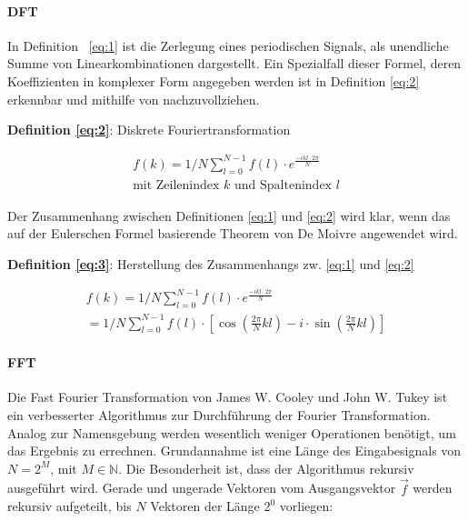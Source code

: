 \paragraph{DFT}
In Definition ~\eqref{eq:1} ist die Zerlegung eines periodischen Signals, als unendliche Summe von Linearkombinationen dargestellt. Ein Spezialfall dieser Formel, deren Koeffizienten in komplexer Form angegeben werden ist in Definition \eqref{eq:2} erkennbar und mithilfe von \cite{arenz_fourier} nachzuvollziehen.

\begin{flushleft}
	\textbf{Definition \eqref{eq:2}}: Diskrete Fouriertransformation
\end{flushleft}
\vspace{\baselineskip}
\begin{equation}
	\begin{gathered}
		f(k) = 1/N \sum_{l=0}^{N-1}f(l) \cdot e^{\frac{-ikl\cdot 2\pi}{N}} \\
		\text{mit Zeilenindex } k \text{ und Spaltenindex } l
	\end{gathered}\label{eq:2}
\end{equation}

Der Zusammenhang zwischen Definitionen \eqref{eq:1} und \eqref{eq:2} wird klar, wenn das auf der Eulerschen Formel basierende Theorem von De Moivre \cite{de_moivre} angewendet wird.

\begin{flushleft}
	\textbf{Definition \eqref{eq:3}}: Herstellung des Zusammenhangs zw. \eqref{eq:1} und \eqref{eq:2}
\end{flushleft}
\vspace{\baselineskip}
\begin{equation}
	\begin{gathered}
		f(k) = 1/N \sum_{l=0}^{N-1}f(l) \cdot e^{\frac{-ikl\cdot 2\pi}{N}} \\
		=  1/N \sum_{l=0}^{N-1}f(l) \cdot \left[ \cos(\frac{2\pi}{N}kl) - i \cdot \sin(\frac{2\pi}{N}kl)\right] 
	\end{gathered}\label{eq:3}
\end{equation}

\paragraph{FFT}
Die Fast Fourier Transformation von James W. Cooley und John W. Tukey ist ein verbesserter Algorithmus zur Durchführung der Fourier Transformation. Analog zur Namensgebung werden wesentlich weniger Operationen benötigt, um das Ergebnis zu errechnen. Grundannahme ist eine Länge des Eingabesignals von $N = 2^{M}$, mit $M\in\mathbb{N}$.
Die Besonderheit ist, dass der Algorithmus rekursiv ausgeführt wird.
Gerade und ungerade Vektoren vom Ausgangsvektor $\vec{f}$ werden rekursiv aufgeteilt, bis $N$ Vektoren der Länge $2^{0}$ vorliegen:

